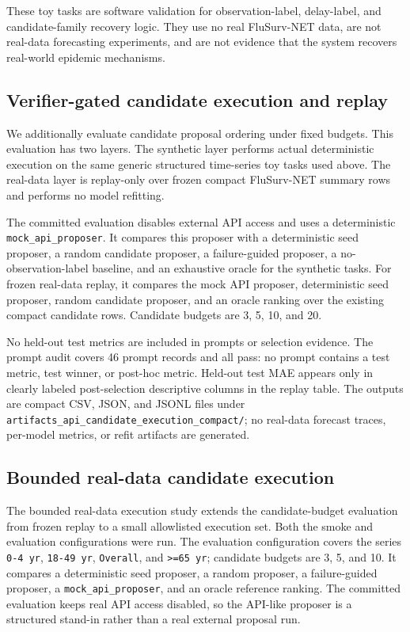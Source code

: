 These toy tasks are software validation for observation-label, delay-label,
and candidate-family recovery logic. They use no real FluSurv-NET data, are
not real-data forecasting experiments, and are not evidence that the system
recovers real-world epidemic mechanisms.

\subsection{Verifier-gated candidate execution and replay}

We additionally evaluate candidate proposal ordering under fixed budgets. This
evaluation has two layers. The synthetic layer performs actual
deterministic execution on the same generic structured time-series toy tasks
used above. The real-data layer is replay-only over frozen compact FluSurv-NET
summary rows and performs no model refitting.

The committed evaluation disables external API access and uses a deterministic
\texttt{mock\_api\_proposer}. It compares this proposer with a deterministic
seed proposer, a random candidate proposer, a failure-guided proposer, a
no-observation-label baseline, and an exhaustive oracle for the synthetic
tasks. For frozen real-data replay, it compares the mock API proposer,
deterministic seed proposer, random candidate proposer, and an oracle ranking
over the existing compact candidate rows. Candidate budgets are \num{3},
\num{5}, \num{10}, and \num{20}.

No held-out test metrics are included in prompts or selection evidence. The
prompt audit covers 46 prompt records and all pass: no prompt contains a test
metric, test winner, or post-hoc metric. Held-out test MAE appears only in
clearly labeled post-selection descriptive columns in the replay table. The
outputs are compact CSV, JSON, and JSONL files under
\texttt{artifacts\_api\_candidate\_execution\_compact/}; no real-data
forecast traces, per-model metrics, or refit artifacts are generated.

\subsection{Bounded real-data candidate execution}

The bounded real-data execution study extends the candidate-budget evaluation
from frozen replay to a small allowlisted execution set. Both the smoke and
evaluation configurations were run. The
evaluation configuration covers the series \texttt{0-4 yr},
\texttt{18-49 yr}, \texttt{Overall}, and \texttt{>=65 yr}; candidate budgets
are \num{3}, \num{5}, and \num{10}. It compares a deterministic seed proposer,
a random proposer, a failure-guided proposer, a \texttt{mock\_api\_proposer},
and an oracle reference ranking. The committed evaluation keeps real API access
disabled, so the API-like proposer is a structured stand-in rather than a real
external proposal run.

